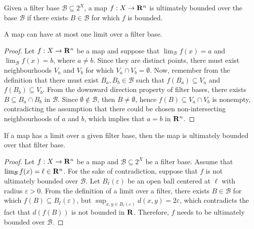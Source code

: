 \begin{definition}\label{def: ulti-bounded-several}
  Given a filter base \(\mathcal B \subseteq 2^X\), a map \(f: X \to \mathbf{R}^n\) is
  ultimately bounded over the base \(\mathcal B\) if there exists \(B \in
  \mathcal B\) for which \(f\) is bounded.
\end{definition}

\begin{proposition}
  A map can have at most one limit over a filter base.
\end{proposition}

\begin{proof}
  Let \(f: X \to \mathbf{R}^n\) be a map and suppose that \(\lim_\mathcal{B} f(x) = a\)
  and \(\lim_\mathcal{B} f(x) = b\), where \(a \neq b\). Since they are distinct
  points, there must exist neighbourhoods \(V_a\) and \(V_b\) for which \(V_a
  \cap V_b = \emptyset\). Now, remember from the definition that there must
  exist \(B_a, B_b \in \mathcal B\) such that \(f(B_a) \subseteq V_a\) and
  \(f(B_b) \subseteq V_b\). From the downward direction property of filter
  bases, there exists \(B \subseteq B_a \cap B_b\) in \(\mathcal B\). Since
  \(\emptyset \not\in \mathcal B\), then \(B \neq \emptyset\), hence \(f(B)
  \subseteq V_a \cap V_b\) is nonempty, contradicting the assumption that there
  could be chosen non-intersecting neighbourhoods of \(a\) and \(b\), which
  implies that \(a = b\) in \(\mathbf{R}^n\).
\end{proof}

\begin{proposition}
  If a map has a limit over a given filter base, then the map is ultimately
  bounded over that filter base.
\end{proposition}

\begin{proof}
  Let \(f: X \to \mathbf{R}^n\) be a map and \(\mathcal B \subseteq 2^X\) be a filter
  base. Assume that \(\lim_\mathcal{B} f(x) = \ell \in \mathbf{R}^n\). For the sake of
  contradiction, suppose that \(f\) is not ultimately bounded over \(\mathcal
  B\). Let \(B_\ell(\varepsilon)\) be an open ball centered at \(\ell\) with
  radius \(\varepsilon > 0\). From the definition of a limit over a filter,
  there exists \(B \in \mathcal B\) for which \(f(B) \subseteq
  B_\ell(\varepsilon)\), but \(\sup_{x, y \in B_\ell(\varepsilon)} d(x, y) = 2
  \varepsilon\), which contradicts the fact that \(d(f(B))\) is not bounded in
  \(\mathbf{R}\). Therefore, \(f\) needs to be ultimately bounded over \(\mathcal B\).
\end{proof}

